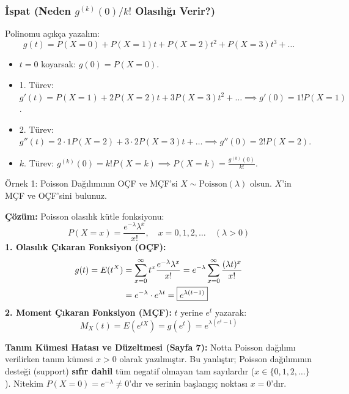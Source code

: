 \documentclass[12pt,a4paper]{article}
\begin{document}
\subsubsection{İspat (Neden $g^{(k)}(0)/k!$ Olasılığı Verir?)}
Polinomu açıkça yazalım:
\begin{equation}
    g(t) = P(X=0) + P(X=1)t + P(X=2)t^2 + P(X=3)t^3 + \dots
\end{equation}
\begin{itemize}
    \item $t=0$ koyarsak: $g(0) = P(X=0)$.
    \item 1. Türev: $g'(t) = P(X=1) + 2P(X=2)t + 3P(X=3)t^2 + \dots \implies g'(0) = 1! P(X=1)$.
    \item 2. Türev: $g''(t) = 2 \cdot 1 P(X=2) + 3 \cdot 2 P(X=3)t + \dots \implies g''(0) = 2! P(X=2)$.
    \item $k$. Türev: $g^{(k)}(0) = k! P(X=k) \implies P(X=k) = \frac{g^{(k)}(0)}{k!}$.
\end{itemize}

\begin{ornek}{Örnek 1: Poisson Dağılımının OÇF ve MÇF'si}
$X \sim \text{Poisson}(\lambda)$ olsun. $X$'in MÇF ve OÇF'sini bulunuz.

\bigskip
\textbf{Çözüm:}
Poisson olasılık kütle fonksiyonu:
\begin{equation}
    P(X = x) = \frac{e^{-\lambda} \lambda^x}{x!}, \quad x = 0, 1, 2, \dots \quad (\lambda > 0)
\end{equation}
\textbf{1. Olasılık Çıkaran Fonksiyon (OÇF):}
\begin{align}
    g(t) = E(t^X) &= \sum_{x=0}^{\infty} t^x \frac{e^{-\lambda} \lambda^x}{x!} = e^{-\lambda} \sum_{x=0}^{\infty} \frac{(\lambda t)^x}{x!} \notag \\
    &= e^{-\lambda} \cdot e^{\lambda t} = \boxed{e^{\lambda(t - 1)}}
\end{align}
\textbf{2. Moment Çıkaran Fonksiyon (MÇF):}  
$t$ yerine $e^t$ yazarak:
\begin{equation}
    M_X(t) = E(e^{tX}) = g(e^t) = \boxed{e^{\lambda(e^t - 1)}}
\end{equation}
\end{ornek}

\begin{uyari}
\textbf{Tanım Kümesi Hatası ve Düzeltmesi (Sayfa 7):}
Notta Poisson dağılımı verilirken tanım kümesi $x > 0$ olarak yazılmıştır. Bu yanlıştır; Poisson dağılımının desteği (support) \textbf{sıfır dahil} tüm negatif olmayan tam sayılardır ($x \in \{0, 1, 2, \dots\}$). Nitekim $P(X=0) = e^{-\lambda} \neq 0$'dır ve serinin başlangıç noktası $x=0$'dır.
\end{uyari}
\end{document}
